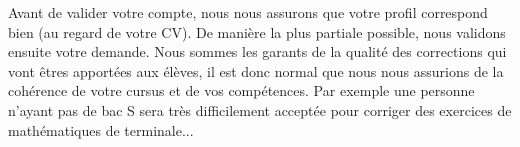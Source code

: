 ﻿Avant de valider votre compte, nous nous assurons que votre profil correspond bien (au regard de votre CV). De manière la plus partiale possible, nous validons ensuite votre demande. Nous sommes les garants de la qualité des corrections qui vont êtres apportées aux élèves, il est donc normal que nous nous assurions de la cohérence de votre cursus et de vos compétences. Par exemple une personne n’ayant pas de bac S sera très difficilement acceptée pour corriger des exercices de mathématiques de terminale...